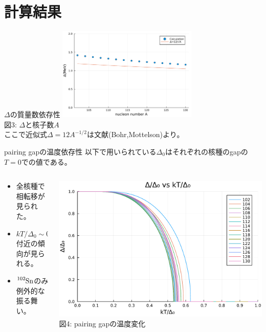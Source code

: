 \documentclass[aspectratio=169, 12pt, dvipdfmx]{beamer}
\begin{document}
\section{計算結果}

\begin{frame}{$\Delta$の質量数依存性}
  \centering
  \includegraphics[width=0.5\textwidth]{fig_pdf/Delta_vs_A.pdf}
  \vspace{5pt} %
  \\
  \scriptsize 図3: $\Delta$と核子数$A$\\
  ここで近似式$\Delta=12A^{-1/2}$は文献\cite{nucleus_structure}(Bohr,Mottelson)より。
\end{frame}

\begin{frame}{pairing gapの温度依存性}
  以下で用いられている\(\Delta_0\)はそれぞれの核種のgapの\(T=0\)での値である。
  \begin{columns}[totalwidth=1.0\linewidth]
    \begin{column}[t]{0.4\linewidth}
      \begin{itemize}
        \item 全核種で相転移が見られた。
        \item $kT/\Delta_0\sim0.55$付近の傾向が見られる。
        \item $\ce{{}^{102}Sn}$のみ例外的な振る舞い。
      \end{itemize}
    \end{column}

    \begin{column}[T]{0.6\linewidth}
      \centering
      \includegraphics[width=\textwidth]{fig_pdf/Comp_FT_dT.pdf}
      \vspace{5pt} %
      \scriptsize 図4: pairing gapの温度変化
  \end{column}
  \end{columns}
\end{frame}
\end{document}
